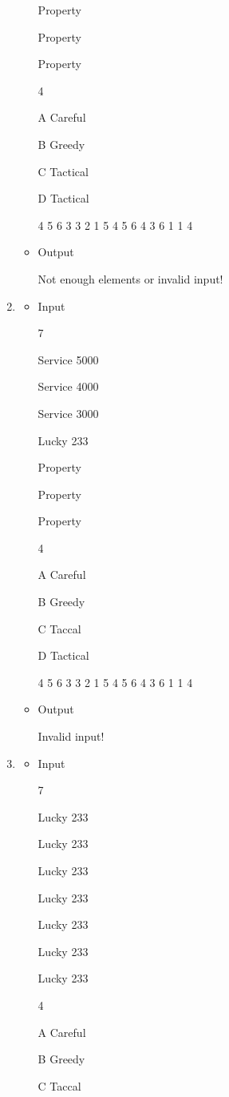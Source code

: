 \documentclass[a4paper, 12pt]{report}
\begin{document}
\begin{enumerate}
\begin{itemize}
Property

Property

Property

4

A Careful

B Greedy

C Tactical

D Tactical

4 5 6 3 3 2 1 5 4 5 6 4 3 6 1 1 4

		\item Output
		
Not enough elements or invalid input!

	\end{itemize}
\item
	\begin{itemize}
		\item Input
		
7

Service 5000

Service 4000

Service 3000

Lucky 233

Property

Property

Property

4

A Careful

B Greedy

C Taccal

D Tactical

4 5 6 3 3 2 1 5 4 5 6 4 3 6 1 1 4

		\item Output
		
Invalid input!

	\end{itemize}
\item
	\begin{itemize}
		\item Input
		
7

Lucky 233

Lucky 233

Lucky 233

Lucky 233

Lucky 233

Lucky 233

Lucky 233

4

A Careful

B Greedy

C Taccal


\end{itemize}
\end{enumerate}
\end{document}
